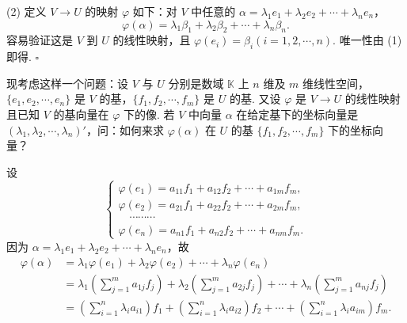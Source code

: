 \documentclass[UTF8,12pt,a4paper,fontset=fandol]{ctexart}
\begin{document}
(2) 定义 $V\to U$ 的映射 $\varphi$ 如下：对 $V$ 中任意的 $\alpha=\lambda_1e_1+\lambda_2e_2+\cdots+\lambda_ne_n$，
\[
\varphi(\alpha)=\lambda_1\beta_1+\lambda_2\beta_2+\cdots+\lambda_n\beta_n.
\]
容易验证这是 $V$ 到 $U$ 的线性映射，且 $\varphi(e_i)=\beta_i(i=1,2,\cdots,n)$. 唯一性由 (1) 即得. $\square$

现考虑这样一个问题：设 $V$ 与 $U$ 分别是数域 $\mathbb{K}$ 上 $n$ 维及 $m$ 维线性空间，$\{e_1,e_2,\cdots,e_n\}$ 是 $V$ 的基，$\{f_1,f_2,\cdots,f_m\}$ 是 $U$ 的基. 又设 $\varphi$ 是 $V\to U$ 的线性映射且已知 $V$ 的基向量在 $\varphi$ 下的像. 若 $V$ 中向量 $\alpha$ 在给定基下的坐标向量是 $(\lambda_1,\lambda_2,\cdots,\lambda_n)'$，问：如何来求 $\varphi(\alpha)$ 在 $U$ 的基 $\{f_1,f_2,\cdots,f_m\}$ 下的坐标向量？

设
\begin{equation}
\left\{
\begin{array}{l}
\varphi(e_1)=a_{11}f_1+a_{12}f_2+\cdots+a_{1m}f_m,\\
\varphi(e_2)=a_{21}f_1+a_{22}f_2+\cdots+a_{2m}f_m,\\
\quad\cdots\cdots\cdots\\
\varphi(e_n)=a_{n1}f_1+a_{n2}f_2+\cdots+a_{nm}f_m.
\end{array}\right.
\tag{4.3.1}
\end{equation}
因为 $\alpha=\lambda_1e_1+\lambda_2e_2+\cdots+\lambda_ne_n$，故
\[
\begin{aligned}
\varphi(\alpha)
&=\lambda_1\varphi(e_1)+\lambda_2\varphi(e_2)+\cdots+\lambda_n\varphi(e_n)\\
&=\lambda_1\left(\sum_{j=1}^m a_{1j}f_j\right)+\lambda_2\left(\sum_{j=1}^m a_{2j}f_j\right)+\cdots+\lambda_n\left(\sum_{j=1}^m a_{nj}f_j\right)\\
&=\left(\sum_{i=1}^n\lambda_i a_{i1}\right)f_1+\left(\sum_{i=1}^n\lambda_i a_{i2}\right)f_2+\cdots+\left(\sum_{i=1}^n\lambda_i a_{im}\right)f_m.
\end{aligned}
\]
\end{document}
